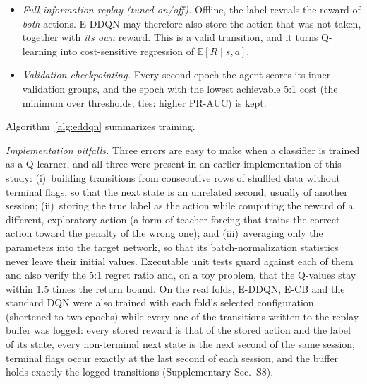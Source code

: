 \begin{itemize}
\item \emph{Full-information replay (tuned on/off).} Offline, the label reveals the reward of \emph{both} actions. E-DDQN may therefore also store the action that was not taken, together with \emph{its own} reward. This is a valid transition, and it turns Q-learning into cost-sensitive regression of $\mathbb{E}[R\mid s,a]$.
\item \emph{Validation checkpointing.} Every second epoch the agent scores its inner-validation groups, and the epoch with the lowest achievable 5:1 cost (the minimum over thresholds; ties: higher PR-AUC) is kept.
\end{itemize}
Algorithm~\ref{alg:eddqn} summarizes training.

\emph{Implementation pitfalls.} Three errors are easy to make when a classifier is trained as a Q-learner, and all three were present in an earlier implementation of this study: (i)~building transitions from consecutive rows of shuffled data without terminal flags, so that the next state is an unrelated second, usually of another session; (ii)~storing the true label as the action while computing the reward of a different, exploratory action (a form of teacher forcing that trains the correct action toward the penalty of the wrong one); and (iii)~averaging only the parameters into the target network, so that its batch-normalization statistics never leave their initial values. Executable unit tests guard against each of them and also verify the 5:1 regret ratio and, on a toy problem, that the Q-values stay within 1.5 times the return bound. On the real folds, E-DDQN, E-CB and the standard DQN were also trained with each fold's selected configuration (shortened to two epochs) while every one of the \PVTransitions{} transitions written to the replay buffer was logged: every stored reward is that of the stored action and the label of its state, every non-terminal next state is the next second of the same session, terminal flags occur exactly at the last second of each session, and the buffer holds exactly the logged transitions (Supplementary Sec.~S8).

